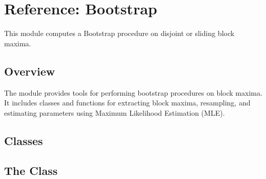 \documentclass[a4paper,11pt,openany,english]{sphinxmanual}
\begin{document}
\begin{enumerate}
\begin{quote}
\begin{sphinxVerbatim}[commandchars=\\\{\}]
       \PYG{p}{[}  \PYG{p}{]}    
\end{sphinxVerbatim}
\end{quote}

\end{enumerate}

\sphinxstepscope


\chapter{Reference: Bootstrap}
\label{\detokenize{api_bootstrap:reference-bootstrap}}\label{\detokenize{api_bootstrap::doc}}
\sphinxAtStartPar
This module computes a Bootstrap procedure on disjoint or sliding block maxima.


\section{Overview}
\label{\detokenize{api_bootstrap:overview}}
\sphinxAtStartPar
The  module provides tools for performing bootstrap procedures on block maxima. It includes classes and functions for extracting block maxima, resampling, and estimating parameters using Maximum Likelihood Estimation (MLE).


\section{Classes}
\label{\detokenize{api_bootstrap:classes}}

\section{The  Class}
\label{\detokenize{api_bootstrap:the-fullbootstrap-class}}
\end{document}
